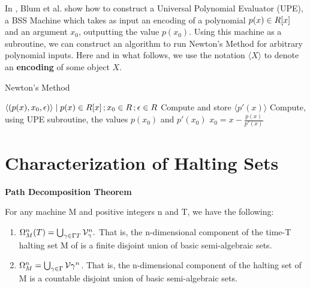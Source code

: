   \begin{example}
    In \cite{B98}, Blum et al. show how to construct a Universal
    Polynomial Evaluator (UPE), a BSS Machine which takes as input an
    encoding of a polynomial $p(x) \in R[x]$ and an argument
    $x_0$, outputting the value $p(x_0)$.  Using this machine as a
    subroutine, we can construct an algorithm to run Newton's Method
    for arbitrary polynomial inputs.  Here and in what follows, we use
    the notation $\langle X \rangle$ to denote an \textbf{encoding} of
    some object $X$.

    \begin{algorithm}
      \caption{Newton's Method} \label{alg:newton}
      \begin{algorithmic}
        \Require $\langle (p(x), x_0, \epsilon) \rangle \mid p(x) \in R[x]\,; x_0 \in R\,; \epsilon \in R$
        \State Compute and store $\langle p'(x) \rangle$
        \State Compute, using UPE subroutine, the values $p(x_0)$ and $p'(x_0)$
        \State $x_0 = x - \frac{p(x)}{p'(x)}$
        \EndWhile
      \end{algorithmic}
    \end{algorithm}
  \end{example}


  \section{Characterization of Halting Sets}

  \begin{theorem}{\textbf{Path Decomposition Theorem}}
    
    For any machine M and positive integers n and T, we have the
    following:

    \begin{enumerate}
    \item $\Omega_M^n(T) = \bigcup_{\gamma \in \Gamma{T}}
      \mathcal{V}_\gamma^n.$ That is, the n-dimensional
      component of the time-T halting set M of is a finite disjoint union
      of basic semi-algebraic sets.
    \item $\Omega_M^n = \bigcup_{\gamma \in \Gamma{}}
      \mathcal{V}{\gamma}^n$.  That is, the n-dimensional
      component of the halting set of M is a countable disjoint union
      of basic semi-algebraic sets.
    \end{enumerate}
  \end{theorem}

